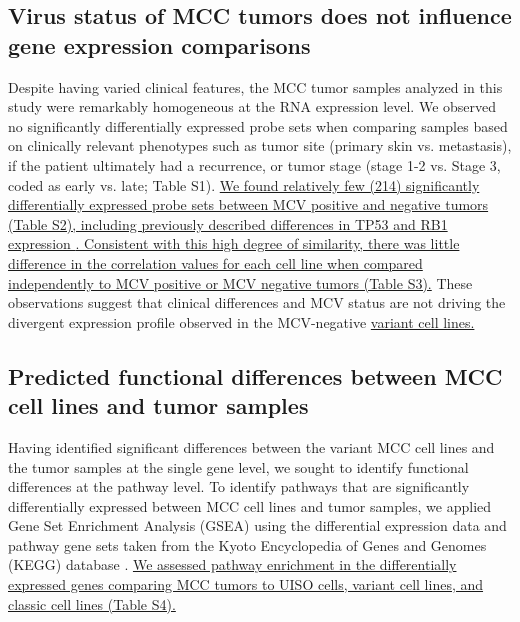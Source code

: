 \documentclass[10pt]{article}
\begin{document}
\subsection*{Virus status of MCC tumors does not influence gene expression comparisons}
Despite having varied clinical features, the MCC tumor samples analyzed in this study were remarkably homogeneous at the RNA expression level.
We observed no significantly differentially expressed probe sets when comparing samples based on clinically relevant phenotypes such as tumor site (primary skin vs. metastasis), if the patient ultimately had a recurrence, or tumor stage (stage 1-2 vs. Stage 3, coded as early vs. late; Table S1).
\uline{We found relatively few (214) significantly differentially expressed probe sets between MCV positive and negative tumors (Table S2), including previously described differences in TP53 and RB1 expression \cite{Waltari2011Association,Sihto2011Merkel,Bhatia2010Merkel}.
Consistent with this high degree of similarity, there was little difference in the correlation values for each cell line when compared independently to MCV positive or MCV negative tumors (Table S3).}
These observations suggest that clinical differences and MCV status are not driving the divergent expression profile observed in the MCV-negative \citep{Guastafierro2013Characterization} \uline{variant cell lines.}

\subsection*{Predicted functional differences between MCC cell lines and tumor samples}
Having identified significant differences between the variant MCC cell lines and the tumor samples at the single gene level, we sought to identify functional differences at the pathway level.
To identify pathways that are significantly differentially expressed between MCC cell lines and tumor samples, we applied Gene Set Enrichment Analysis (GSEA) \citep{Subramanian2005Gene} using the differential expression data and pathway gene sets taken from the Kyoto Encyclopedia of Genes and Genomes (KEGG) database \citep{Kanehisa2000KEGG}.
\uline{We assessed pathway enrichment in the differentially expressed genes comparing MCC tumors to UISO cells, variant cell lines, and classic cell lines (Table S4).}
\end{document}
